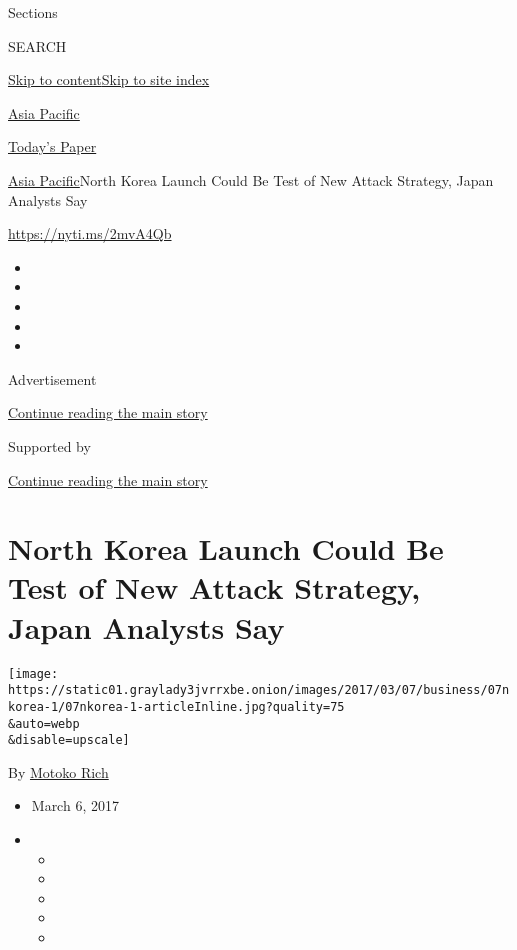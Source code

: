 Sections

SEARCH

\protect\hyperlink{site-content}{Skip to
content}\protect\hyperlink{site-index}{Skip to site index}

\href{https://www.nytimes3xbfgragh.onion/section/world/asia}{Asia
Pacific}

\href{https://myaccount.nytimes3xbfgragh.onion/auth/login?response_type=cookie\&client_id=vi}{}

\href{https://www.nytimes3xbfgragh.onion/section/todayspaper}{Today's
Paper}

\href{/section/world/asia}{Asia Pacific}\textbar{}North Korea Launch
Could Be Test of New Attack Strategy, Japan Analysts Say

\url{https://nyti.ms/2mvA4Qb}

\begin{itemize}
\item
\item
\item
\item
\item
\end{itemize}

Advertisement

\protect\hyperlink{after-top}{Continue reading the main story}

Supported by

\protect\hyperlink{after-sponsor}{Continue reading the main story}

\hypertarget{north-korea-launch-could-be-test-of-new-attack-strategy-japan-analysts-say}{%
\section{North Korea Launch Could Be Test of New Attack Strategy, Japan
Analysts
Say}\label{north-korea-launch-could-be-test-of-new-attack-strategy-japan-analysts-say}}

\texttt{[image: https://static01.graylady3jvrrxbe.onion/images/2017/03/07/business/07nkorea-1/07nkorea-1-articleInline.jpg?quality=75\\\&auto=webp\\\&disable=upscale]}

By \href{http://www.nytimes3xbfgragh.onion/by/motoko-rich}{Motoko Rich}

\begin{itemize}
\item
  March 6, 2017
\item
  \begin{itemize}
  \item
  \item
  \item
  \item
  \item
  \end{itemize}
\end{itemize}

